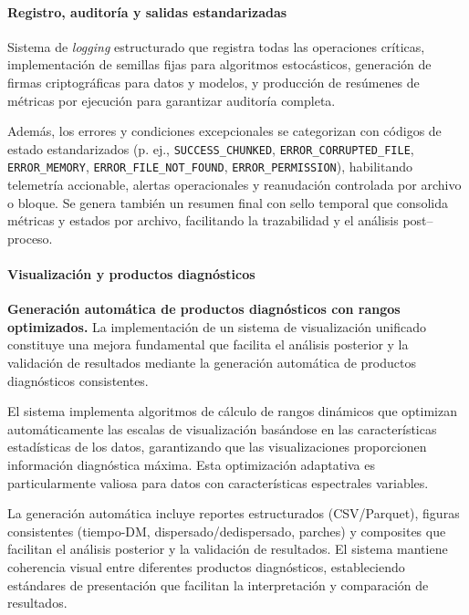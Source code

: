 \paragraph{Registro, auditoría y salidas estandarizadas}

Sistema de \emph{logging} estructurado que registra todas las operaciones críticas, implementación de semillas fijas para algoritmos estocásticos, generación de firmas criptográficas para datos y modelos, y producción de resúmenes de métricas por ejecución para garantizar auditoría completa.

Además, los errores y condiciones excepcionales se categorizan con códigos de estado estandarizados (p. ej., \texttt{SUCCESS\_CHUNKED}, \texttt{ERROR\_CORRUPTED\_FILE}, \texttt{ERROR\_MEMORY}, \texttt{ERROR\_FILE\_NOT\_FOUND}, \texttt{ERROR\_PERMISSION}), habilitando telemetría accionable, alertas operacionales y reanudación controlada por archivo o bloque. Se genera también un resumen final con sello temporal que consolida métricas y estados por archivo, facilitando la trazabilidad y el análisis post--proceso.

\paragraph{Visualización y productos diagnósticos}

\noindent\textbf{Generación automática de productos diagnósticos con rangos optimizados.} La implementación de un sistema de visualización unificado constituye una mejora fundamental que facilita el análisis posterior y la validación de resultados mediante la generación automática de productos diagnósticos consistentes.

El sistema implementa algoritmos de cálculo de rangos dinámicos que optimizan automáticamente las escalas de visualización basándose en las características estadísticas de los datos, garantizando que las visualizaciones proporcionen información diagnóstica máxima. Esta optimización adaptativa es particularmente valiosa para datos con características espectrales variables.

La generación automática incluye reportes estructurados (CSV/Parquet), figuras consistentes (tiempo-DM, dispersado/dedispersado, parches) y composites que facilitan el análisis posterior y la validación de resultados. El sistema mantiene coherencia visual entre diferentes productos diagnósticos, estableciendo estándares de presentación que facilitan la interpretación y comparación de resultados.

